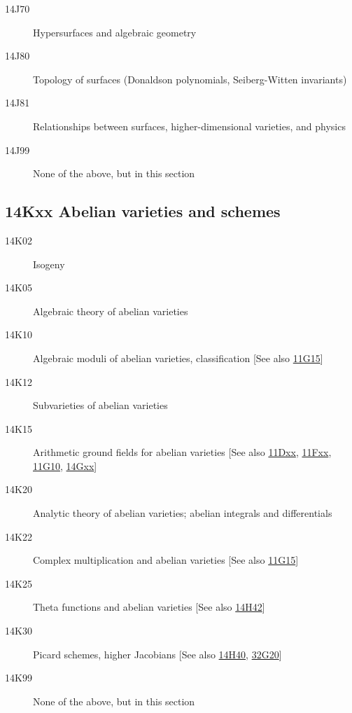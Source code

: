\documentclass[letterpaper]{article}
\begin{document}
\begin{description}
\item [14J70]\label{14J70} Hypersurfaces and algebraic geometry
\item [14J80]\label{14J80} Topology of surfaces (Donaldson polynomials, Seiberg-Witten invariants)
\item [14J81]\label{14J81} Relationships between surfaces, higher-dimensional varieties, and physics
\item [14J99]\label{14J99} None of the above, but in this section
\end{description}          
\subsection*{14Kxx Abelian varieties and schemes }\label{14Kxx}
\begin{description}               
\item [14K02]\label{14K02} Isogeny
\item [14K05]\label{14K05} Algebraic theory of abelian varieties
\item [14K10]\label{14K10} Algebraic moduli of abelian varieties, classification [See also \hyperref[11G15]{11G15}]
\item [14K12]\label{14K12} Subvarieties of abelian varieties
\item [14K15]\label{14K15} Arithmetic ground fields for abelian varieties [See also \hyperref[11Dxx]{11Dxx}, \hyperref[11Fxx]{11Fxx}, \hyperref[11G10]{11G10}, \hyperref[14Gxx]{14Gxx}]
\item [14K20]\label{14K20} Analytic theory of abelian varieties; abelian integrals and differentials
\item [14K22]\label{14K22} Complex multiplication and abelian varieties [See also \hyperref[11G15]{11G15}]
\item [14K25]\label{14K25} Theta functions and abelian varieties [See also \hyperref[14H42]{14H42}]
\item [14K30]\label{14K30} Picard schemes, higher Jacobians [See also \hyperref[14H40]{14H40}, \hyperref[32G20]{32G20}]
\item [14K99]\label{14K99} None of the above, but in this section
\end{description}          
\end{document}
